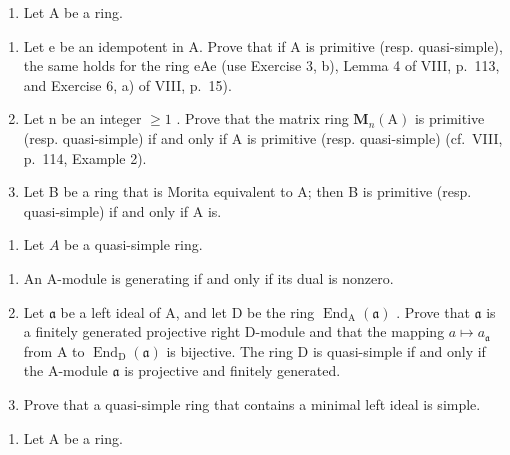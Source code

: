 \begin{enumerate}
\def\labelenumi{\arabic{enumi})}
\setcounter{enumi}{4}
\tightlist
\item
  Let \(\mathrm{A}\) be a ring.
\end{enumerate}

\begin{enumerate}
\def\labelenumi{\alph{enumi})}
\item
  Let e be an idempotent in A. Prove that if A is primitive (resp. quasi-simple), the same holds for the ring eAe (use Exercise 3, b), Lemma 4 of VIII, p.~113, and Exercise 6, a) of VIII, p.~15).
\item
  Let n be an integer \(\geqslant 1\) . Prove that the matrix ring \(\mathbf{M}_{n}(\mathrm{A})\) is primitive (resp. quasi-simple) if and only if A is primitive (resp. quasi-simple) (cf.~VIII, p.~114, Example 2).
\item
  Let B be a ring that is Morita equivalent to A; then B is primitive (resp. quasi-simple) if and only if A is.
\end{enumerate}

\begin{enumerate}
\def\labelenumi{\arabic{enumi})}
\setcounter{enumi}{5}
\tightlist
\item
  Let \(A\) be a quasi-simple ring.
\end{enumerate}

\begin{enumerate}
\def\labelenumi{\alph{enumi})}
\item
  An A-module is generating if and only if its dual is nonzero.
\item
  Let \(\mathfrak{a}\) be a left ideal of A, and let D be the ring \(\operatorname{End}_{\mathrm{A}}(\mathfrak{a})\) . Prove that \(\mathfrak{a}\) is a finitely generated projective right D-module and that the mapping \(a \mapsto a_{\mathfrak{a}}\) from A to \(\operatorname{End}_{\mathrm{D}}(\mathfrak{a})\) is bijective. The ring D is quasi-simple if and only if the A-module \(\mathfrak{a}\) is projective and finitely generated.
\item
  Prove that a quasi-simple ring that contains a minimal left ideal is simple.
\end{enumerate}

\begin{enumerate}
\def\labelenumi{\arabic{enumi})}
\setcounter{enumi}{6}
\tightlist
\item
  Let A be a ring.
\end{enumerate}

